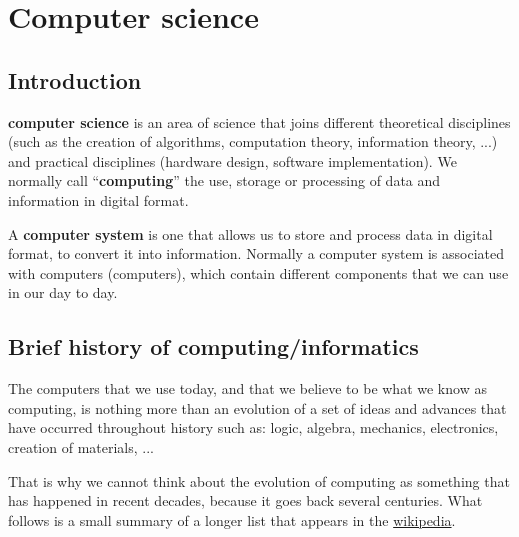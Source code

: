 \vfill
\pagebreak

\chapter{Computer science}

\section{Introduction}

\textbf{computer science} is an area of science that joins different theoretical disciplines (such as the creation of algorithms, computation theory, information theory, ...) and practical disciplines (hardware design, software implementation). We normally call “\textbf{computing}” the use, storage or processing of data and information in digital format.

A \textbf{computer system} is one that allows us to store and process data in digital format, to convert it into information. Normally a computer system is associated with computers (computers), which contain different components that we can use in our day to day.

\section{Brief history of computing/informatics}

The computers that we use today, and that we believe to be what we know as computing, is nothing more than an evolution of a set of ideas and advances that have occurred throughout history such as: logic, algebra, mechanics, electronics, creation of materials, ...

That is why we cannot think about the evolution of computing as something that has happened in recent decades, because it goes back several centuries. What follows is a small summary of a longer list that appears in the \href{https://es.wikipedia.org/wiki/Anexo:Historia_de_la_computaci%C3%B3n}{wikipedia}.

